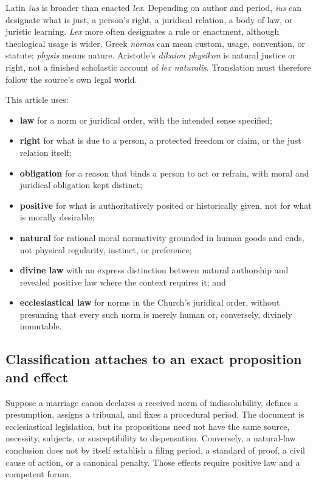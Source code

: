 Latin \emph{ius} is broader than enacted \emph{lex}. Depending on author and period, \emph{ius} can designate what is just, a person's right, a juridical relation, a body of law, or juristic learning. \emph{Lex} more often designates a rule or enactment, although theological usage is wider. Greek \emph{nomos} can mean custom, usage, convention, or statute; \emph{physis} means nature. Aristotle's \emph{dikaion physikon} is natural justice or right, not a finished scholastic account of \emph{lex naturalis}. Translation must therefore follow the source's own legal world.

This article uses:

\begin{itemize}
\item \textbf{law} for a norm or juridical order, with the intended sense specified;
\item \textbf{right} for what is due to a person, a protected freedom or claim, or the just relation itself;
\item \textbf{obligation} for a reason that binds a person to act or refrain, with moral and juridical obligation kept distinct;
\item \textbf{positive} for what is authoritatively posited or historically given, not for what is morally desirable;
\item \textbf{natural} for rational moral normativity grounded in human goods and ends, not physical regularity, instinct, or preference;
\item \textbf{divine law} with an express distinction between natural authorship and revealed positive law where the context requires it; and
\item \textbf{ecclesiastical law} for norms in the Church's juridical order, without presuming that every such norm is merely human or, conversely, divinely immutable.
\end{itemize}

\subsection{Classification attaches to an exact proposition and effect}

Suppose a marriage canon declares a received norm of indissolubility, defines a presumption, assigns a tribunal, and fixes a procedural period. The document is ecclesiastical legislation, but its propositions need not have the same source, necessity, subjects, or susceptibility to dispensation. Conversely, a natural-law conclusion does not by itself establish a filing period, a standard of proof, a civil cause of action, or a canonical penalty. Those effects require positive law and a competent forum.

